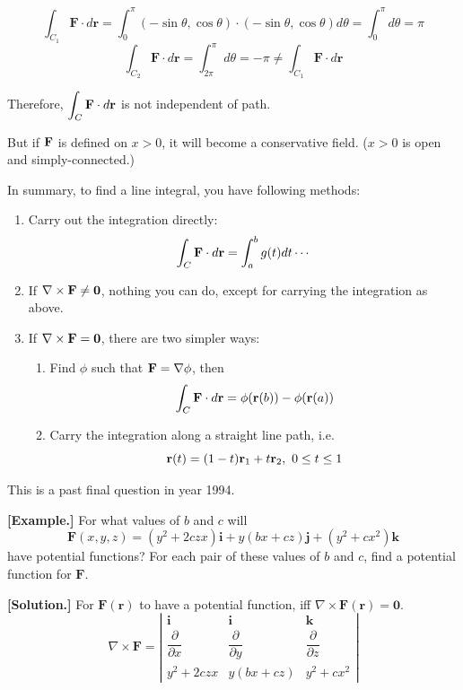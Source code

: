 \documentclass[11pt, a4paper]{MATH2023}
\newcommand{\eg}{\textbf{[Example.] }}
\newcommand{\sol}{\textbf{[Solution.] }}
\newcommand{\rr}{{\bf r}}
\newcommand{\FF}{{\bf F}}
\begin{document}
\begin{spacing}{1.3}
    $$\int_{C_{1}} \mathbf{F} \cdot d \mathbf{r}=\int_{0}^{\pi}(-\sin \theta, \cos \theta) \cdot(-\sin \theta, \cos \theta) d \theta=\int_{0}^{\pi} d \theta=\pi$$
    $$\int_{C_{2}} \mathbf{F} \cdot d \mathbf{r}=\int_{2 \pi}^{\pi} d \theta=-\pi \neq \int_{C_{1}} \mathbf{F} \cdot d \mathbf{r}$$

    Therefore, $\displaystyle \int_{C} \mathbf{F} \cdot d \mathbf{r}$ is not independent of path.

    \vspace{0.3in}
    {\blue But if $\FF$ is defined on $x>0$, it will become a conservative field. ($x>0$ is open and simply-connected.)}


    \newpage
    {\blue In summary, to find a line integral, you have following methods:}
    \begin{enumerate}
        \item Carry out the integration directly: 
        $$\int_C \FF\cdot d\rr=\int_a^b g(t) dt\cdots$$
        \item If $\nabla \times \FF \ne {\bf 0}$, nothing you can do, except for 
        carrying the integration as above.
        \item If $\nabla \times \FF = {\bf 0}$, there are two simpler ways:
        \begin{enumerate}
            \item Find $\phi$ such that $\FF =\nabla \phi$, then 
            $$\int_C \FF \cdot d\rr=\phi (\rr(b))-\phi (\rr(a))$$
            \item Carry the integration along a straight line path, i.e. 
            $$\rr(t)=(1-t)\rr_1+t\rr_2,\ 0\le t\le 1$$
        \end{enumerate}
    \end{enumerate}

    \newpage
    {\blue This is a past final question in year 1994.}

    \eg For what values of $b$ and $c$ will
    $$\mathbf{F}(x, y, z)=\left(y^{2}+2 c z x\right) \mathbf{i}+y(b x+c z) \mathbf{j}+\left(y^{2}+c x^{2}\right) \mathbf{k}$$
    have potential functions? For each pair of these values of $b$ and $c$, find a potential function for $\mathbf{F}$.

    \sol 
    For $\mathbf{F}(\mathbf{r})$ to have a potential function, iff $\nabla \times \mathbf{F}(\mathbf{r})=\mathbf{0}$.
    $$\nabla \times \mathbf{F}=\left|\begin{array}{ccc}
        \mathbf{i} & \mathbf{i} & \mathbf{k} \\
        \dfrac{\partial}{\partial x} & \dfrac{\partial}{\partial y} & \dfrac{\partial}{\partial z} \\
        y^{2}+2 c z x & y(b x+c z) & y^{2}+c x^{2}
    \end{array}\right|$$


\end{spacing}
\end{document}
